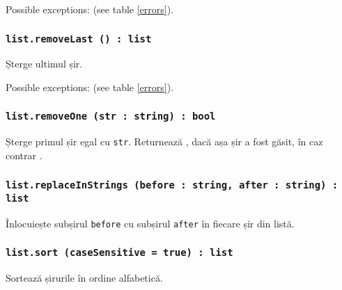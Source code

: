 Possible exceptions:  (see table \ref{errors}).

\subsubsection{\texttt{list.removeLast () : list}}

Șterge ultimul șir.

Possible exceptions:  (see table \ref{errors}).

\subsubsection{\texttt{list.removeOne (str : string) : bool}}

Șterge primul șir egal cu \texttt{str}. Returnează \true, dacă așa șir a fost găsit, în caz contrar \false.

\subsubsection{\texttt{list.replaceInStrings (before : string, after : string) : list}}

Înlocuiește subșirul \texttt{before} cu subșirul \texttt{after} în fiecare șir din listă.

\subsubsection{\texttt{list.sort (caseSensitive = true) : list}}

Sortează șirurile în ordine alfabetică.

